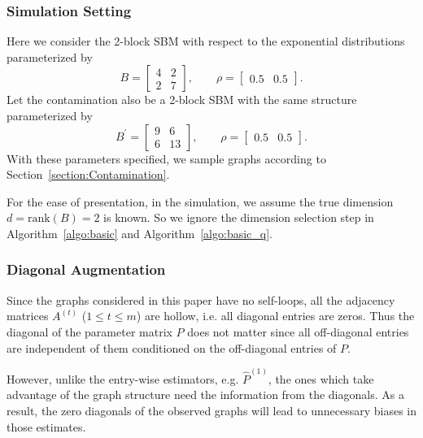 \documentclass[a4paper]{article}
\renewcommand{\hat}{\widehat}
\begin{document}
\subsubsection{Simulation Setting}
\label{section:sim_setting}
Here we consider the 2-block SBM with respect to the exponential distributions parameterized by
\begin{equation*}
B = \begin{bmatrix}
4 & 2 \\
2 & 7
\end{bmatrix}
,\qquad \rho = \begin{bmatrix}
0.5 & 0.5
\end{bmatrix}.
\end{equation*}
Let the contamination also be a 2-block SBM with the same structure parameterized by
\begin{equation*}
B^{\prime} = \begin{bmatrix}
9 & 6 \\
6 & 13
\end{bmatrix}
,\qquad \rho = \begin{bmatrix}
0.5 & 0.5
\end{bmatrix}.
\end{equation*}
With these parameters specified, we sample graphs according to Section~\ref{section:Contamination}.

For the ease of presentation, in the simulation, we assume the true dimension $d = \mathrm{rank}(B) = 2$ is known. So we ignore the dimension selection step in Algorithm~\ref{algo:basic} and Algorithm~\ref{algo:basic_q}.


\subsubsection{Diagonal Augmentation}
\label{section:diag_aug}

Since the graphs considered in this paper have no self-loops, all the adjacency matrices $A^{(t)}$ ($1 \le t \le m$) are hollow, i.e. all diagonal entries are zeros. Thus the diagonal of the parameter matrix $P$ does not matter since all off-diagonal entries are independent of them conditioned on the off-diagonal entries of $P$.

However, unlike the entry-wise estimators, e.g. $\hat{P}^{(1)}$, the ones which take advantage of the graph structure need the information from the diagonals. As a result, the zero diagonals of the observed graphs will lead to unnecessary biases in those estimates.
\end{document}
